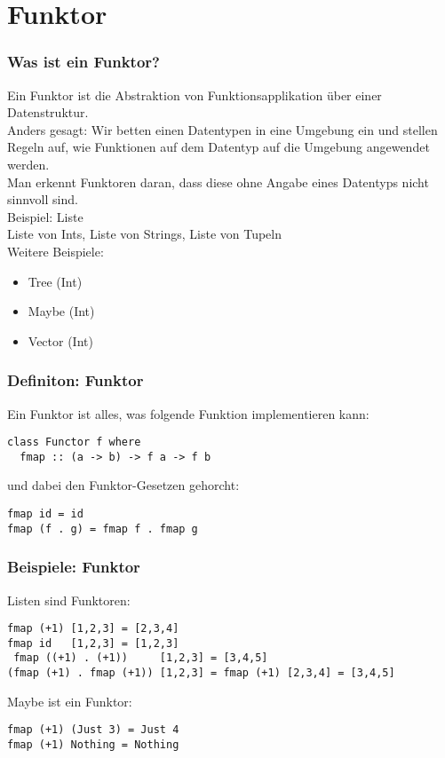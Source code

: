 \documentclass[10pt]{beamer}
\begin{document}
\section{Funktor}
\begin{frame}[fragile]
\frametitle{Was ist ein Funktor?}
\pause
Ein Funktor ist die Abstraktion von Funktionsapplikation über einer Datenstruktur.\\
\pause
Anders gesagt: Wir betten einen Datentypen in eine Umgebung ein und stellen Regeln auf, wie Funktionen auf dem Datentyp auf die Umgebung angewendet werden.\\
Man erkennt Funktoren daran, dass diese ohne Angabe eines Datentyps nicht sinnvoll sind.\\
\pause
Beispiel: Liste\\
Liste von Ints, Liste von Strings, Liste von Tupeln\\
\pause
Weitere Beispiele:\\
\begin{itemize}
 \item Tree (Int)
 \item Maybe (Int)
 \item Vector (Int)
\end{itemize}
\end{frame}

\begin{frame}[fragile]
\frametitle{Definiton: Funktor}
\pause
Ein Funktor ist alles, was folgende Funktion implementieren kann:
\begin{lstlisting}
class Functor f where
  fmap :: (a -> b) -> f a -> f b
\end{lstlisting}
und dabei den Funktor-Gesetzen gehorcht:
\begin{lstlisting}
fmap id = id
fmap (f . g) = fmap f . fmap g
\end{lstlisting}
\end{frame}

\begin{frame}[fragile]
\frametitle{Beispiele: Funktor}
Listen sind Funktoren:
\begin{lstlisting}
fmap (+1) [1,2,3] = [2,3,4]
fmap id   [1,2,3] = [1,2,3]
 fmap ((+1) . (+1))     [1,2,3] = [3,4,5]
(fmap (+1) . fmap (+1)) [1,2,3] = fmap (+1) [2,3,4] = [3,4,5]
\end{lstlisting}
\pause
Maybe ist ein Funktor:
\begin{lstlisting}
fmap (+1) (Just 3) = Just 4
fmap (+1) Nothing = Nothing
\end{lstlisting}
\end{frame}
\end{document}
